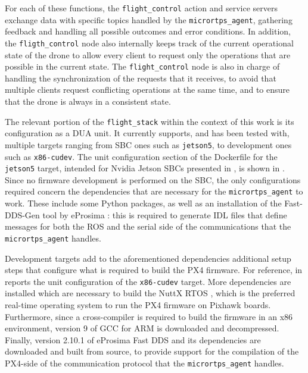 For each of these functions, the \texttt{flight\_control} action and service servers exchange data with specific topics handled by the \texttt{micrortps\_agent}, gathering feedback and handling all possible outcomes and error conditions. In addition, the \texttt{fligth\_control} node also internally keeps track of the current operational state of the drone to allow every client to request only the operations that are possible in the current state. The \texttt{flight\_control} node is also in charge of handling the synchronization of the requests that it receives, to avoid that multiple clients request conflicting operations at the same time, and to ensure that the drone is always in a consistent state.

The relevant portion of the \texttt{flight\_stack} within the context of this work is its configuration as a DUA unit. It currently supports, and has been tested with, multiple targets ranging from SBC ones such as \texttt{jetson5}, to development ones such as \texttt{x86-cudev}. The unit configuration section of the Dockerfile for the \texttt{jetson5} target, intended for Nvidia Jetson SBCs presented in , is shown in . Since no firmware development is performed on the SBC, the only configurations required concern the dependencies that are necessary for the \texttt{micrortps\_agent} to work. These include some Python packages, as well as an installation of the Fast-DDS-Gen tool by eProsima \cite{eprosima_fast-dds-gen_nodate}: this is required to generate IDL files that define messages for both the ROS and the serial side of the communications that the \texttt{micrortps\_agent} handles.

Development targets add to the aforementioned dependencies additional setup steps that configure what is required to build the PX4 firmware. For reference,  in  reports the unit configuration of the \texttt{x86-cudev} target. More dependencies are installed which are necessary to build the NuttX RTOS \cite{apache_software_foundation_apache_nodate}, which is the preferred real-time operating system to run the PX4 firmware on Pixhawk boards. Furthermore, since a cross-compiler is required to build the firmware in an x86 environment, version 9 of GCC \cite{free_software_foundation_gcc_nodate} for ARM is downloaded and decompressed. Finally, version 2.10.1 of eProsima Fast DDS and its dependencies are downloaded and built from source, to provide support for the compilation of the PX4-side of the communication protocol that the \texttt{micrortps\_agent} handles.

